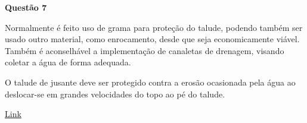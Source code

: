 \item[]\textbf{Questão 7}

Normalmente é feito uso de grama para proteção do talude, podendo também ser usado outro material, como enrocamento, desde que seja economicamente viável. Também é aconselhável a implementação de canaletas de drenagem, visando coletar a água de forma adequada.

O talude de jusante deve ser protegido contra a erosão ocasionada pela água ao deslocar-se em grandes velocidades do topo ao pé do talude.

\href{http://professor.pucgoias.edu.br/SiteDocente/admin/arquivosUpload/15030/material/barragem_terra_2.pdf}{Link}